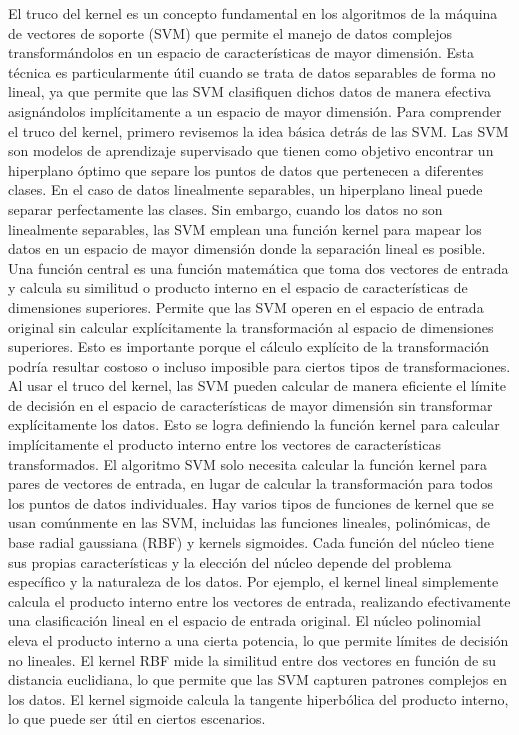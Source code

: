 El truco del kernel es un concepto fundamental en los algoritmos de la máquina de vectores de soporte (SVM) que permite el manejo de datos complejos transformándolos en un espacio de características de mayor dimensión. Esta técnica es particularmente útil cuando se trata de datos separables de forma no lineal, ya que permite que las SVM clasifiquen dichos datos de manera efectiva asignándolos implícitamente a un espacio de mayor dimensión.
Para comprender el truco del kernel, primero revisemos la idea básica detrás de las SVM. Las SVM son modelos de aprendizaje supervisado que tienen como objetivo encontrar un hiperplano óptimo que separe los puntos de datos que pertenecen a diferentes clases. En el caso de datos linealmente separables, un hiperplano lineal puede separar perfectamente las clases. Sin embargo, cuando los datos no son linealmente separables, las SVM emplean una función kernel para mapear los datos en un espacio de mayor dimensión donde la separación lineal es posible.
Una función central es una función matemática que toma dos vectores de entrada y calcula su similitud o producto interno en el espacio de características de dimensiones superiores. Permite que las SVM operen en el espacio de entrada original sin calcular explícitamente la transformación al espacio de dimensiones superiores. Esto es importante porque el cálculo explícito de la transformación podría resultar costoso o incluso imposible para ciertos tipos de transformaciones.
Al usar el truco del kernel, las SVM pueden calcular de manera eficiente el límite de decisión en el espacio de características de mayor dimensión sin transformar explícitamente los datos. Esto se logra definiendo la función kernel para calcular implícitamente el producto interno entre los vectores de características transformados. El algoritmo SVM solo necesita calcular la función kernel para pares de vectores de entrada, en lugar de calcular la transformación para todos los puntos de datos individuales.
Hay varios tipos de funciones de kernel que se usan comúnmente en las SVM, incluidas las funciones lineales, polinómicas, de base radial gaussiana (RBF) y kernels sigmoides. Cada función del núcleo tiene sus propias características y la elección del núcleo depende del problema específico y la naturaleza de los datos.
Por ejemplo, el kernel lineal simplemente calcula el producto interno entre los vectores de entrada, realizando efectivamente una clasificación lineal en el espacio de entrada original. El núcleo polinomial eleva el producto interno a una cierta potencia, lo que permite límites de decisión no lineales. El kernel RBF mide la similitud entre dos vectores en función de su distancia euclidiana, lo que permite que las SVM capturen patrones complejos en los datos. El kernel sigmoide calcula la tangente hiperbólica del producto interno, lo que puede ser útil en ciertos escenarios.

